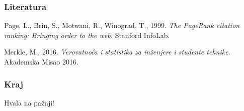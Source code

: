 \documentclass[11pt]{beamer}
\begin{document}
\begin{frame}
    \frametitle{Literatura}
  		\begin{center}
\begin{thebibliography}{9}
Page, L., Brin, S., Motwani, R., Winograd, T., 1999. \textit{The PageRank citation ranking: Bringing order to the web.} Stanford InfoLab.

Merkle, M., 2016. \textit{Verovatnoća i statistika za inženjere i studente tehnike.} Akademska Misao 2016.
\end{thebibliography}
        \end{center}
\end{frame}

\begin{frame}
\frametitle{Kraj}
\begin{center}
\huge{Hvala na pažnji!}
\end{center}
\end{frame}
\end{document}
